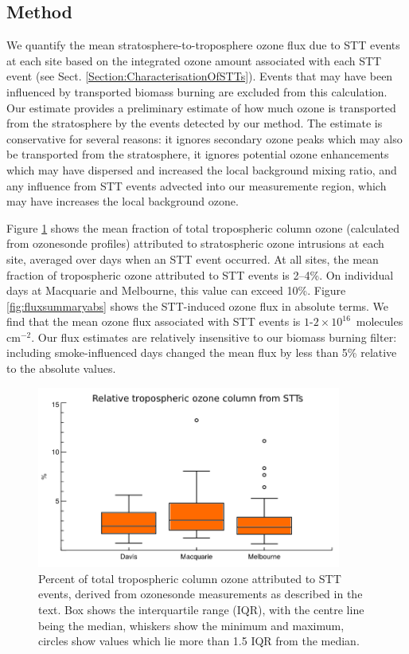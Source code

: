 \documentclass[acp, manuscript]{copernicus} %
\begin{document}
  \subsection{Method}
    We quantify the mean stratosphere-to-troposphere ozone flux due to STT events at each site based on the integrated ozone amount associated with each STT event (see Sect. \ref{Section:CharacterisationOfSTTs}).
    Events that may have been influenced by transported biomass burning are excluded from this calculation.
    Our estimate provides a preliminary estimate of how much ozone is transported from the stratosphere by the events detected by our method.
    The estimate is conservative for several reasons: it ignores secondary ozone peaks which may also be transported from the stratosphere, it ignores potential ozone enhancements which may have dispersed and increased the local background mixing ratio, and any influence from STT events advected into our measuremente region, which may have increases the local background ozone.
    
    Figure \ref{fig:fluxsummary} shows the mean fraction of total tropospheric column ozone (calculated from ozonesonde profiles) attributed to stratospheric ozone intrusions at each site, averaged over days when an STT event occurred.
    At all sites, the mean fraction of tropospheric ozone attributed to STT events is 2--4\%. On individual days at Macquarie and Melbourne, this value can exceed 10\%.
    Figure \ref{fig:fluxsummaryabs} shows the STT-induced ozone flux in absolute terms.
    We find that the mean ozone flux associated with STT events is $1$-$2 \times 10^{16}$~molecules cm$^{-2}$.
    Our flux estimates are relatively insensitive to our biomass burning filter: including smoke-influenced days changed the mean flux by less than 5\% relative to the absolute values.
    
    \begin{figure}
      \includegraphics[width=10cm]{figures/flux_relative.png}
      \caption{%
	Percent of total tropospheric column ozone attributed to STT events, derived from ozonesonde measurements as described in the text.
	Box shows the interquartile range (IQR), with the centre line being the median, whiskers show the minimum and maximum, circles show values which lie more than 1.5 IQR from the median.}
      \label{fig:fluxsummary}
    \end{figure}
    
\end{document}
